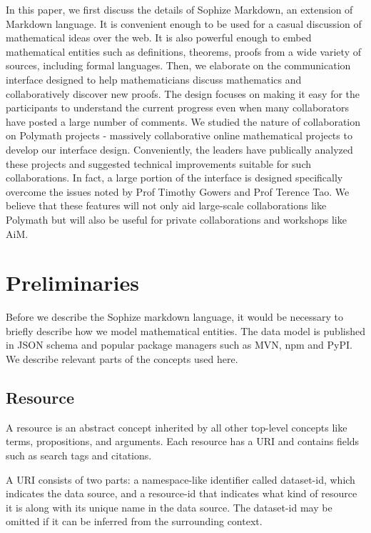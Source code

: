 \documentclass[a4paper]{article}
\begin{document}
In this paper, we first discuss the details of Sophize Markdown, an extension of Markdown language. It is convenient enough to be used for a casual discussion of mathematical ideas over the web. It is also powerful enough to embed mathematical entities such as definitions, theorems, proofs from a wide variety of sources, including formal languages. Then, we elaborate on the communication interface designed to help mathematicians discuss mathematics and collaboratively discover new proofs. The design focuses on making it easy for the participants to understand the current progress even when many collaborators have posted a large number of comments. We studied the nature of collaboration on Polymath projects - massively collaborative online mathematical projects to develop our interface design. Conveniently, the leaders have publically analyzed these projects and suggested technical improvements suitable for such collaborations. In fact, a large portion of the interface is designed specifically overcome the issues noted by Prof Timothy Gowers \cite{gowers_weblog_2009} and Prof Terence Tao\cite{whats_new_2009}. We believe that these features will not only aid large-scale collaborations like Polymath but will also be useful for private collaborations and workshops like AiM.



\section{Preliminaries}


Before we describe the Sophize markdown language, it would be necessary to briefly describe how we model mathematical entities. The data model is published in JSON schema\cite{sophize_datamodel} and popular package managers such as MVN, npm and PyPI. We describe relevant parts of the concepts used here.


\subsection*{Resource}

A resource is an abstract concept inherited by all other top-level concepts like terms, propositions, and arguments. Each resource has a URI and contains fields such as search tags and citations.


A URI consists of two parts: a namespace-like identifier called dataset-id, which indicates the data source, and a resource-id that indicates what kind of resource it is along with its unique name in the data source. The dataset-id may be omitted if it can be inferred from the surrounding context.
\end{document}

